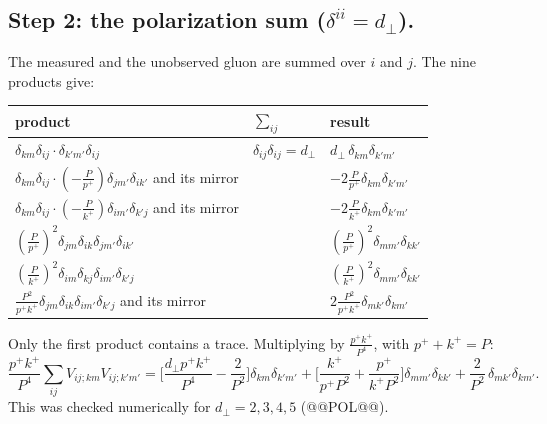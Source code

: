 \documentclass[10pt]{article}
\numberwithin{equation}{section}
\begin{document}
\subsection{Step 2: the polarization sum (\texorpdfstring{$\delta^{ii}=d_\perp$}{delta ii = d}).}
The measured and the unobserved gluon are summed over $i$ and $j$. The nine products give:
\begin{center}\small
\begin{tabular}{@{}lll@{}}\toprule
product & $\sum_{ij}$ & result\\\midrule
$\delta_{km}\delta_{ij}\cdot\delta_{k'm'}\delta_{ij}$ & $\delta_{ij}\delta_{ij}=d_\perp$ & $d_\perp\,\delta_{km}\delta_{k'm'}$\\
$\delta_{km}\delta_{ij}\cdot(-\frac{P}{p^+})\delta_{jm'}\delta_{ik'}$ and its mirror & & $-2\frac{P}{p^+}\delta_{km}\delta_{k'm'}$\\
$\delta_{km}\delta_{ij}\cdot(-\frac{P}{k^+})\delta_{im'}\delta_{k'j}$ and its mirror & & $-2\frac{P}{k^+}\delta_{km}\delta_{k'm'}$\\
$(\frac{P}{p^+})^2\delta_{jm}\delta_{ik}\delta_{jm'}\delta_{ik'}$ & & $(\frac{P}{p^+})^2\delta_{mm'}\delta_{kk'}$\\
$(\frac{P}{k^+})^2\delta_{im}\delta_{kj}\delta_{im'}\delta_{k'j}$ & & $(\frac{P}{k^+})^2\delta_{mm'}\delta_{kk'}$\\
$\frac{P^2}{p^+k^+}\delta_{jm}\delta_{ik}\delta_{im'}\delta_{k'j}$ and its mirror & & $2\frac{P^2}{p^+k^+}\delta_{mk'}\delta_{km'}$\\\bottomrule
\end{tabular}
\end{center}
Only the first product contains a trace. Multiplying by $\frac{p^+k^+}{P^4}$, with $p^++k^+=P$:
\begin{equation}
\frac{p^+k^+}{P^4}\sum_{ij}V_{ij;km}V_{ij;k'm'}=\Big[\frac{d_\perp p^+k^+}{P^4}-\frac{2}{P^2}\Big]\delta_{km}\delta_{k'm'}+\Big[\frac{k^+}{p^+P^2}+\frac{p^+}{k^+P^2}\Big]\delta_{mm'}\delta_{kk'}+\frac{2}{P^2}\,\delta_{mk'}\delta_{km'}.
\label{eq:polsum}
\end{equation}
This was checked numerically for $d_\perp=2,3,4,5$ (@@POL@@).
\end{document}
